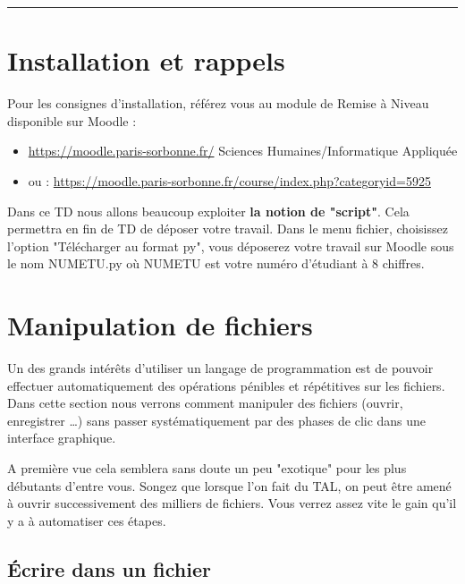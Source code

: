 \newcommand{\numTD}{TD2}
\newcommand{\themeTD}{Fichiers et Structures de Données}



\hrule

\section*{Installation et rappels}

 Pour les consignes d'installation, référez vous au module de Remise à Niveau disponible sur Moodle :
\begin{itemize}
\item \url{https://moodle.paris-sorbonne.fr/} Sciences Humaines/Informatique Appliquée
\item ou : \url{https://moodle.paris-sorbonne.fr/course/index.php?categoryid=5925}
\end{itemize}

 Dans ce TD nous allons beaucoup exploiter \textbf{la notion de "script"}. Cela permettra en fin de TD de déposer votre travail.
Dans le menu fichier, choisissez l'option "Télécharger au format py", vous déposerez votre travail sur Moodle sous le nom NUMETU.py où NUMETU est votre numéro d'étudiant à 8 chiffres.

\section{Manipulation de fichiers}

 Un des grands intérêts d'utiliser un langage de programmation est de pouvoir effectuer automatiquement des opérations pénibles et répétitives sur les fichiers. Dans cette section nous verrons comment manipuler des fichiers (ouvrir, enregistrer \dots) sans passer systématiquement par des phases de clic dans une interface graphique.

 A première vue cela semblera sans doute un peu "exotique" pour les plus débutants d'entre vous. Songez que lorsque l'on fait du TAL, on peut être amené à ouvrir successivement des milliers de fichiers. Vous verrez assez vite le gain qu'il y a à automatiser ces étapes.

\subsection{Écrire dans un fichier}

